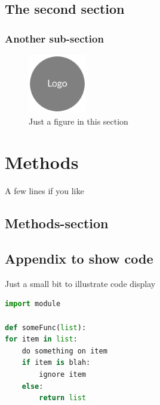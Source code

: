 \documentclass[a4paper, oneside, 11pt]{book}
\begin{document}
\section{The second section}

\subsection{Another sub-section}
\lipsum[1-3]
\begin{figure}
  \centering
	\includegraphics[width=1in, keepaspectratio]{logo.png}
	\caption[Short Caption]{\small Just a figure in this section}
\end{figure}
\lipsum[1]

\afterpage{\clearpage}
\FloatBarrier


\chapter{Methods}

A few lines if you like

\section{Methods-section}
\lipsum[1-2]

\afterpage{\clearpage}
\FloatBarrier


\appendix
\begin{appendices}
\appendixpage
\addappheadtotoc
\chapter{Appendix to show code}
Just a small bit to illustrate code display

\begin{lstlisting}[language=Python]
import module

def someFunc(list):
for item in list:
	do something on item
	if item is blah:
		ignore item
	else:
		return list
\end{lstlisting}

\end{appendices}
\end{document}
